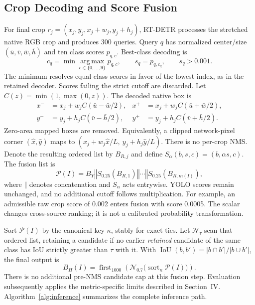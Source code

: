 \documentclass[journal]{IEEEtran}
\begin{document}
\subsection{Crop Decoding and Score Fusion}
For final crop $r_j=(x_j,y_j,x_j+w_j,y_j+h_j)$, RT-DETR processes the stretched native RGB crop and produces 300 queries. Query $q$ has normalized center/size $(\bar u,\bar v,\bar w,\bar h)$ and ten class scores $p_{q,c}$. Best-class decoding is
\begin{equation}
c_q=\min\operatorname*{arg\,max}_{c\in\{0,\ldots,9\}}p_{q,c},
\qquad s_q=p_{q,c_q},\qquad s_q>0.001.
\label{eq:query-decoding}
\end{equation}
The minimum resolves equal class scores in favor of the lowest index, as in the retained decoder. Scores failing the strict cutoff are discarded. Let $C(z)=\min(1,\max(0,z))$. The decoded native box is
\begin{equation}
\begin{aligned}
x^-&=x_j+w_jC(\bar u-\bar w/2),&
x^+&=x_j+w_jC(\bar u+\bar w/2),\\
y^-&=y_j+h_jC(\bar v-\bar h/2),&
y^+&=y_j+h_jC(\bar v+\bar h/2).
\end{aligned}
\label{eq:mapping}
\end{equation}
Zero-area mapped boxes are removed. Equivalently, a clipped network-pixel corner $(\hat x,\hat y)$ maps to $(x_j+w_j\hat x/L,\ y_j+h_j\hat y/L)$. There is no per-crop NMS. Denote the resulting ordered list by $B_{R,j}$ and define $S_\alpha(b,s,c)=(b,\alpha s,c)$. The fusion list is
\begin{equation}
\mathcal P(I)=B_Y\mathbin{\Vert}
S_{0.25}(B_{R,1})\mathbin{\Vert}\cdots\mathbin{\Vert}
S_{0.25}(B_{R,m(I)}),
\label{eq:fusion}
\end{equation}
where $\Vert$ denotes concatenation and $S_\alpha$ acts entrywise. YOLO scores remain unchanged, and no additional cutoff follows multiplication. For example, an admissible raw crop score of 0.002 enters fusion with score 0.0005. The scalar changes cross-source ranking; it is not a calibrated probability transformation.

Sort $\mathcal P(I)$ by the canonical key $\kappa$, stably for exact ties. Let $\mathcal N_{\tau}$ scan that ordered list, retaining a candidate if no earlier \emph{retained} candidate of the same class has IoU strictly greater than $\tau$ with it. With $\operatorname{IoU}(b,b')=|b\cap b'|/|b\cup b'|$, the final output is
\begin{equation}
B_H(I)=\operatorname{first}_{1000}
\left(\mathcal N_{0.7}\bigl(\operatorname{sort}_{\kappa}\mathcal P(I)\bigr)\right).
\label{eq:final-output}
\end{equation}
There is no additional pre-NMS candidate cap at this fusion step. Evaluation subsequently applies the metric-specific limits described in Section~IV. Algorithm~\ref{alg:inference} summarizes the complete inference path.
\end{document}
